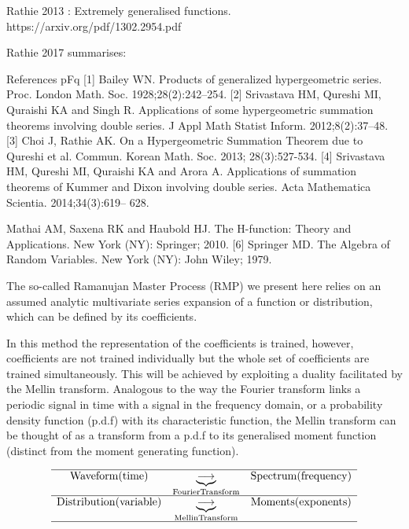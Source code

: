\documentclass{article}
\begin{document}
\citep{Rathie2013}
Rathie 2013 : Extremely generalised functions.
https://arxiv.org/pdf/1302.2954.pdf


Rathie 2017 summarises:

References pFq
[1] Bailey WN. Products of generalized hypergeometric series. Proc. London Math. Soc.
1928;28(2):242–254.
[2] Srivastava HM, Qureshi MI, Quraishi KA and Singh R. Applications of some hypergeometric
summation theorems involving double series. J Appl Math Statist Inform. 2012;8(2):37–48.
[3] Choi J, Rathie AK. On a Hypergeometric Summation Theorem due to Qureshi et al. Commun.
Korean Math. Soc. 2013; 28(3):527-534.
[4] Srivastava HM, Qureshi MI, Quraishi KA and Arora A. Applications of summation theorems
of Kummer and Dixon involving double series. Acta Mathematica Scientia. 2014;34(3):619–
628.


Mathai AM, Saxena RK and Haubold HJ. The H-function: Theory and Applications. New
York (NY): Springer; 2010.
[6] Springer MD. The Algebra of Random Variables. New York (NY): John Wiley; 1979.



The so-called Ramanujan Master Process (RMP) we present here relies on an assumed analytic multivariate series expansion of a function or distribution, which can be defined by its coefficients. 

In this method the representation of the coefficients is trained, however, coefficients are not trained individually but the whole set of coefficients are trained simultaneously. This will be achieved by exploiting a duality facilitated by the Mellin transform. Analogous to the way the Fourier transform links a periodic signal in time with a signal in the frequency domain, or a probability density function (p.d.f) with its characteristic function, the Mellin transform can be thought of as a transform from a p.d.f to its generalised moment function (distinct from the moment generating function). \par

\begin{equation}
\begin{matrix}
\hline
\mathrm{Waveform}(\mathrm{time}) & \underbrace{\longrightarrow}_{\mathrm{Fourier Transform}} & \mathrm{Spectrum}(\mathrm{frequency})\\
\hline
\mathrm{Distribution}(\mathrm{variable}) & \underbrace{\longrightarrow}_{\mathrm{Mellin Transform}} & \mathrm{Moments}(\mathrm{exponents}) \\
\hline
\end{matrix}
\end{equation}
\end{document}
